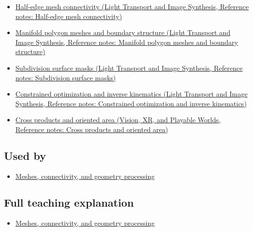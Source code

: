 \begin{itemize}
\tightlist
\item
  \href{../04-Light-Transport-and-Image-Synthesis/main.pdf\#nameddest=appendix-1aea26b2307f}{Half-edge mesh connectivity (Light Transport and Image Synthesis, Reference notes: Half-edge mesh connectivity)}
\item
  \href{../04-Light-Transport-and-Image-Synthesis/main.pdf\#nameddest=appendix-fab348609369}{Manifold polygon meshes and boundary structure (Light Transport and Image Synthesis, Reference notes: Manifold polygon meshes and boundary structure)}
\item
  \href{../04-Light-Transport-and-Image-Synthesis/main.pdf\#nameddest=appendix-0234ab7f86b1}{Subdivision surface masks (Light Transport and Image Synthesis, Reference notes: Subdivision surface masks)}
\item
  \href{../04-Light-Transport-and-Image-Synthesis/main.pdf\#nameddest=appendix-29f4bea4c2bb}{Constrained optimization and inverse kinematics (Light Transport and Image Synthesis, Reference notes: Constrained optimization and inverse kinematics)}
\item
  \href{../07-Vision-XR-and-Playable-Worlds/main.pdf\#nameddest=appendix-2391db8052b1}{Cross products and oriented area (Vision, XR, and Playable Worlds, Reference notes: Cross products and oriented area)}
\end{itemize}

\subsection{Used by}\label{appendix-7107009c505b-used-by}

\begin{itemize}
\tightlist
\item
  \hyperref[03-visual-computing-i-ch002-meshes-connectivity-and-geometry-processing]{Meshes, connectivity, and geometry processing}
\end{itemize}

\subsection{Full teaching explanation}\label{appendix-7107009c505b-full-teaching-explanation}

\begin{itemize}
\tightlist
\item
  \hyperref[03-visual-computing-i-ch002-meshes-connectivity-and-geometry-processing]{Meshes, connectivity, and geometry processing}
\end{itemize}

